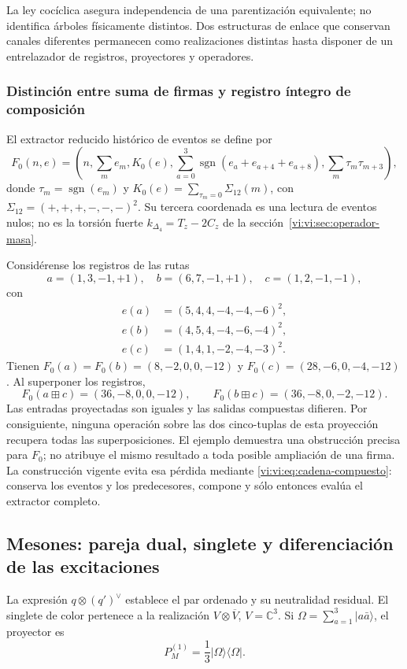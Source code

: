 La ley cocíclica asegura independencia de una parentización equivalente;
no identifica árboles físicamente distintos. Dos estructuras de enlace
que conservan canales diferentes permanecen como realizaciones distintas
hasta disponer de un entrelazador de registros, proyectores y operadores.

\subsubsection{Distinción entre suma de firmas y registro íntegro de composición}

El extractor reducido histórico de eventos se define por
\[
 F_0(n,e)=\left(n,\sum_m e_m,K_0(e),
 \sum_{a=0}^3\operatorname{sgn}(e_a+e_{a+4}+e_{a+8}),
 \sum_m\tau_m\tau_{m+3}\right),
\]
donde \(\tau_m=\operatorname{sgn}(e_m)\) y
\(K_0(e)=\sum_{\tau_m=0}\Sigma_{12}(m)\), con
\(\Sigma_{12}=(+,+,+,-,-,-)^2\). Su tercera coordenada es una
lectura de eventos nulos; no es la torsión fuerte
\(k_{\Delta_4}=T_z-2C_z\) de la
sección~\ref{vi:vi:sec:operador-masa}.

Considérense los registros de las rutas
\[
 a=(1,3,-1,+1),\quad b=(6,7,-1,+1),\quad c=(1,2,-1,-1),
\]
con
\begin{align*}
 e(a)&=(5,4,4,-4,-4,-6)^2,\\
 e(b)&=(4,5,4,-4,-6,-4)^2,\\
 e(c)&=(1,4,1,-2,-4,-3)^2.
\end{align*}
Tienen \(F_0(a)=F_0(b)=(8,-2,0,0,-12)\) y
\(F_0(c)=(28,-6,0,-4,-12)\). Al superponer los registros,
\[
 F_0(a\boxplus c)=(36,-8,0,0,-12),\qquad
 F_0(b\boxplus c)=(36,-8,0,-2,-12).
\]
Las entradas proyectadas son iguales y las salidas compuestas difieren.
Por consiguiente, ninguna operación sobre las dos cinco-tuplas de esta
proyección recupera todas las superposiciones. El ejemplo demuestra una
obstrucción precisa para \(F_0\); no atribuye el mismo resultado a toda
posible ampliación de una firma. La construcción vigente evita esa
pérdida mediante \eqref{vi:vi:eq:cadena-compuesto}: conserva los eventos
y los predecesores, compone y sólo entonces evalúa el extractor completo.

\subsection{Mesones: pareja dual, singlete y diferenciación de las excitaciones}
\label{vi:vi:subsec:mesones-familias}

La expresión \(q\otimes(q')^\vee\) establece el par ordenado y su
neutralidad residual. El singlete de color pertenece a la realización
\(V\otimes\overline V\), \(V=\mathbb C^3\). Si
\(\Omega=\sum_{a=1}^3|a\bar a\rangle\), el proyector es
\begin{equation}
 P_M^{(1)}=\frac13|\Omega\rangle\langle\Omega|.
 \label{vi:vi:eq:singlete-meson}
\end{equation}

